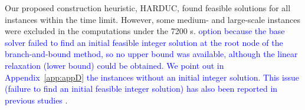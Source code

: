 
Our proposed construction heuristic, HARDUC, found feasible solutions for all instances within the time limit. However, some medium- and large-scale instances were excluded in the computations under the 7200 s. \textcolor{blue}{option because the base solver failed to find an initial feasible integer solution at the root node of the branch-and-bound method, so no upper bound was available, although the linear relaxation (lower bound) could be obtained. We point out in Appendix~\ref{app:appD} the instances without an initial integer solution. This issue (failure to find an initial feasible integer solution) has also been reported in previous studies \citep{Cong2015,Knueven2020b,Morales-Espania2015,Wuijts2024} }.







